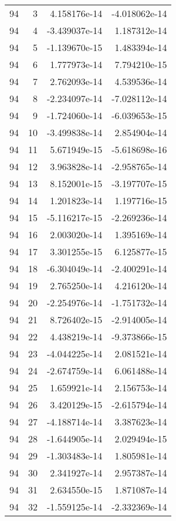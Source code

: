 \begin{tabular}{rrrr}
  94 &    3 &  4.158176e-14 & -4.018062e-14 \\
  94 &    4 & -3.439037e-14 &  1.187312e-14 \\
  94 &    5 & -1.139670e-15 &  1.483394e-14 \\
  94 &    6 &  1.777973e-14 &  7.794210e-15 \\
  94 &    7 &  2.762093e-14 &  4.539536e-14 \\
  94 &    8 & -2.234097e-14 & -7.028112e-14 \\
  94 &    9 & -1.724060e-14 & -6.039653e-15 \\
  94 &   10 & -3.499838e-14 &  2.854904e-14 \\
  94 &   11 &  5.671949e-15 & -5.618698e-16 \\
  94 &   12 &  3.963828e-14 & -2.958765e-14 \\
  94 &   13 &  8.152001e-15 & -3.197707e-15 \\
  94 &   14 &  1.201823e-14 &  1.197716e-15 \\
  94 &   15 & -5.116217e-15 & -2.269236e-14 \\
  94 &   16 &  2.003020e-14 &  1.395169e-14 \\
  94 &   17 &  3.301255e-15 &  6.125877e-15 \\
  94 &   18 & -6.304049e-14 & -2.400291e-14 \\
  94 &   19 &  2.765250e-14 &  4.216120e-14 \\
  94 &   20 & -2.254976e-14 & -1.751732e-14 \\
  94 &   21 &  8.726402e-15 & -2.914005e-14 \\
  94 &   22 &  4.438219e-14 & -9.373866e-15 \\
  94 &   23 & -4.044225e-14 &  2.081521e-14 \\
  94 &   24 & -2.674759e-14 &  6.061488e-14 \\
  94 &   25 &  1.659921e-14 &  2.156753e-14 \\
  94 &   26 &  3.420129e-15 & -2.615794e-14 \\
  94 &   27 & -4.188714e-14 &  3.387623e-14 \\
  94 &   28 & -1.644905e-14 &  2.029494e-15 \\
  94 &   29 & -1.303483e-14 &  1.805981e-14 \\
  94 &   30 &  2.341927e-14 &  2.957387e-14 \\
  94 &   31 &  2.634550e-15 &  1.871087e-14 \\
  94 &   32 & -1.559125e-14 & -2.332369e-14 \\

\end{tabular}
